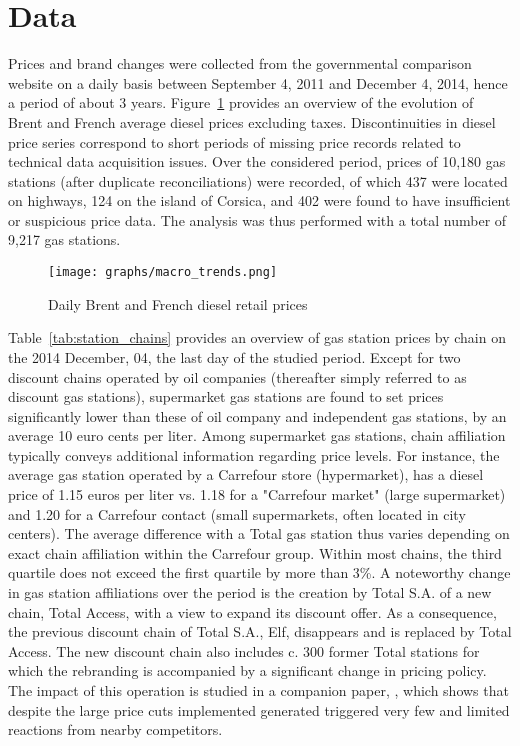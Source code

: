 \documentclass[english]{article}
\begin{document}
\section{Data}

Prices and brand changes were collected from the governmental comparison website on a daily basis between September 4, 2011 and December 4, 2014, hence a period of about 3 years. Figure~\ref{fig:brent_and_diesel} provides an overview of the evolution of Brent and French average diesel prices excluding taxes. Discontinuities in diesel price series correspond to short periods of missing price records related to technical data acquisition issues. Over the considered period, prices of 10,180 gas stations (after duplicate reconciliations) were recorded, of which 437 were located on highways, 124 on the island of Corsica, and 402 were found to have insufficient or suspicious price data. The analysis was thus performed with a total number of 9,217 gas stations.

\begin{figure}[htb!]
    \caption{Daily Brent and French diesel retail prices}
	\centering
		\texttt{[image: graphs/macro\_trends.png]}
\label{fig:brent_and_diesel}
\end{figure}

Table~\ref{tab:station_chains} provides an overview of gas station prices by chain on the 2014 December, 04, the last day of the studied period. Except for two discount chains operated by oil companies (thereafter simply referred to as discount gas stations), supermarket gas stations are found to set prices significantly lower than these of oil company and independent gas stations, by an average 10 euro cents per liter. Among supermarket gas stations, chain affiliation typically conveys additional information regarding price levels. For instance, the average gas station operated by a Carrefour store (hypermarket), has a diesel price of 1.15 euros per liter vs. 1.18 for a "Carrefour market" (large supermarket) and 1.20 for a Carrefour contact (small supermarkets, often located in city centers). The average difference with a Total gas station thus varies depending on exact chain affiliation within the Carrefour group. Within most chains, the third quartile does not exceed the first quartile by more than 3\%. A noteworthy change in gas station affiliations over the period is the creation by Total S.A. of a new chain, Total Access, with a view to expand its discount offer. As a consequence, the previous discount chain of Total S.A., Elf, disappears and is replaced by Total Access. The new discount chain also includes c. 300 former Total stations for which the rebranding is accompanied by a significant change in pricing policy. The impact of this operation is studied in a companion paper, \cite{CHA16}, which shows that despite the large price cuts implemented generated triggered very few and limited reactions from nearby competitors.
\end{document}
